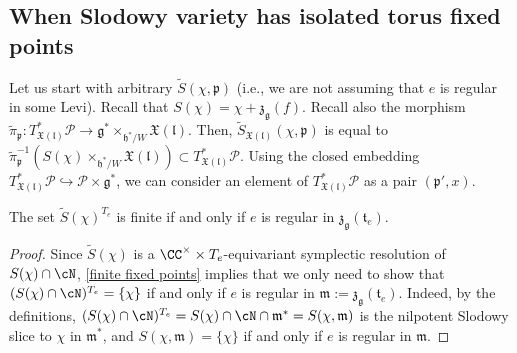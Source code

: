 \documentclass[12pt]{amsart}
\begin{document}
\subsection{When Slodowy variety has isolated torus fixed points} Let us start with arbitrary $\widetilde{S}(\chi,\mathfrak{p})$ (i.e., we are not assuming that $e$ is regular in some Levi). Recall that $S(\chi)=\chi+\mathfrak{z}_{\mathfrak{g}}(f)$.  
Recall  also the morphism $\widetilde{\pi}_{\mathfrak{p}} \colon T^*_{\mathfrak{X}(\mathfrak{l})}\mathcal{P} \rightarrow \mathfrak{g}^* \times_{\mathfrak{h}^*/W} \mathfrak{X}(\mathfrak{l})$. 
Then, $ \widetilde{S}_{\mathfrak{X}(\mathfrak{l})}(\chi,\mathfrak{p})$ is equal to $\widetilde{\pi}_{\mathfrak{p}}^{-1}(S(\chi) \times_{\mathfrak{h}^*/W} \mathfrak{X}(\mathfrak{l})) \subset T^*_{\mathfrak{X}(\mathfrak{l})}\mathcal{P}$. 
Using the closed embedding $T^*_{\mathfrak{X}(\mathfrak{l})}\mathcal{P} \hookrightarrow \mathcal{P} \times \mathfrak{g}^*$, we can consider an element of $T^*_{\mathfrak{X}(\mathfrak{l})}\mathcal{P}$ as a pair $(\mathfrak{p}',x)$. 


\begin{lemma}
 The set $\widetilde{S}(\chi)^{T_e}$ is finite if and only if $e$ is regular in $\mathfrak{z}_{\mathfrak{g}}(\mathfrak{t}_e)$.
\end{lemma}
\begin{proof}
Since $\widetilde{S}(\chi)$ is a $\CC^\times \times T_e$-equivariant symplectic resolution of $S(\chi)\cap \cN$, \cref{finite fixed points} implies that we only need to show that $(S(\chi)\cap \cN)^{T_e}=\{\chi\}$ if and only if $e$ is regular in $\mathfrak{m}:=\mathfrak{z}_{\mathfrak{g}}(\mathfrak{t}_e)$. Indeed, by the definitions, $(S(\chi)\cap \cN)^{T_e}=S(\chi) \cap \cN\cap \mathfrak{m}^*=S(\chi,\mathfrak{m})$ is the nilpotent Slodowy slice to $\chi$ in $\mathfrak{m}^*$, and $S(\chi,\mathfrak{m})=\{\chi\}$ if and only if $e$ is regular in $\mathfrak{m}$.
\end{proof}
\end{document}
